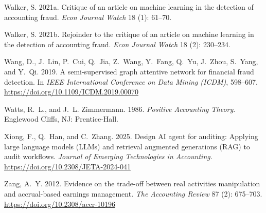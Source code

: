 \documentclass[12pt]{article}
\begin{document}
\begin{thebibliography}{}
Walker, S. 2021a.
\newblock Critique of an article on machine learning in the detection of
  accounting fraud.
\newblock \textit{Econ Journal Watch} 18 (1): 61--70.

Walker, S. 2021b.
\newblock Rejoinder to the critique of an article on machine learning in the
  detection of accounting fraud.
\newblock \textit{Econ Journal Watch} 18 (2): 230--234.

Wang, D., J.~Lin, P.~Cui, Q.~Jia, Z.~Wang, Y.~Fang, Q.~Yu, J.~Zhou,
  S.~Yang, and Y.~Qi. 2019.
\newblock A semi-supervised graph attentive network for financial fraud
  detection.
\newblock In \textit{IEEE International Conference on Data Mining (ICDM)},
  598--607.
  \url{https://doi.org/10.1109/ICDM.2019.00070}

Watts, R.~L., and J.~L. Zimmermann. 1986.
\newblock \textit{Positive Accounting Theory}.
\newblock Englewood Cliffs, NJ: Prentice-Hall.

Xiong, F., Q.~Han, and C.~Zhang. 2025.
\newblock Design AI agent for auditing: Applying large language models (LLMs)
  and retrieval augmented generations (RAG) to audit workflows.
\newblock \textit{Journal of Emerging Technologies in Accounting}.
  \url{https://doi.org/10.2308/JETA-2024-041}

Zang, A.~Y. 2012.
\newblock Evidence on the trade-off between real activities manipulation and
  accrual-based earnings management.
\newblock \textit{The Accounting Review} 87 (2): 675--703.
  \url{https://doi.org/10.2308/accr-10196}

\end{thebibliography}
\end{document}
